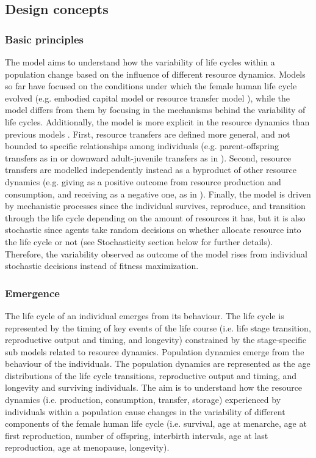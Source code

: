 \documentclass{article}
\begin{document}
\subsection{Design concepts}

\subsubsection{Basic principles}

The model aims to understand how the variability of life cycles within a population change based on the influence of different resource dynamics. Models so far have focused on the conditions under which the female human life cycle evolved (e.g. embodied capital model \citep{kaplan1996theory} or resource transfer model \citep{chu2006co}), while the model differs from them by focusing in the mechanisms behind the variability of life cycles. Additionally, the model is more explicit in the resource dynamics than previous models \citep{price2020fitness,kaplan1996theory,chu2006co,lee2003rethinking,kramer2010pooled}. First, resource transfers are defined more general, and not bounded to specific relationships among individuals (e.g. parent-offspring transfers as in \cite{kaplan1996theory} or downward adult-juvenile transfers as in \cite{chu2006co}). Second, resource transfers are modelled independently instead as a byproduct of other resource dynamics (e.g. giving as a positive outcome from resource production and consumption, and receiving as a negative one, as in \cite{lee2003rethinking,chu2006co}). Finally, the model is driven by mechanistic processes since the individual survives, reproduce, and transition through the life cycle depending on the amount of resources it has, but it is also stochastic since agents take random decisions on whether allocate resource into the life cycle or not (see Stochasticity section below for further details). Therefore, the variability observed as outcome of the model rises from individual stochastic decisions instead of fitness maximization.

\subsubsection{Emergence}

The life cycle of an individual emerges from its behaviour. The life cycle is represented by the timing of key events of the life course (i.e. life stage transition, reproductive output and timing, and longevity) constrained by the stage-specific sub models related to resource dynamics. Population dynamics emerge from the behaviour of the individuals. The population dynamics are represented as the age distributions of the life cycle transitions, reproductive output and timing, and longevity and surviving individuals. The aim is to understand how the resource dynamics (i.e. production, consumption, transfer, storage) experienced by individuals within a population cause changes in the variability of different components of the female human life cycle (i.e. survival, age at menarche, age at first reproduction, number of offspring, interbirth intervals, age at last reproduction, age at menopause, longevity).
\end{document}
